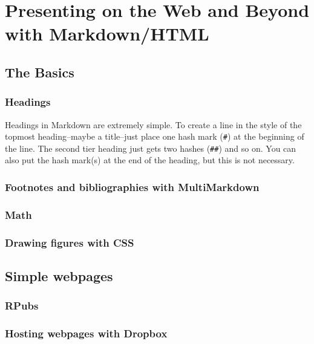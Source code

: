 



\chapter{Presenting on the Web and Beyond with Markdown/HTML}\label{MarkdownChapter}

\section{The Basics}

\subsection{Headings}

Headings in Markdown are extremely simple. To create a line in the style of the topmost heading--maybe a title--just place one hash mark (\texttt{\#}) at the beginning of the line. The second tier heading just gets two hashes (\texttt{\#\#}) and so on. You can also put the hash mark(s) at the end of the heading, but this is not necessary.

\subsection{Footnotes and bibliographies with MultiMarkdown}

\subsection{Math}

\subsection{Drawing figures with CSS}

\section{Simple webpages}

\subsection{RPubs}

\subsection{Hosting webpages with Dropbox}

